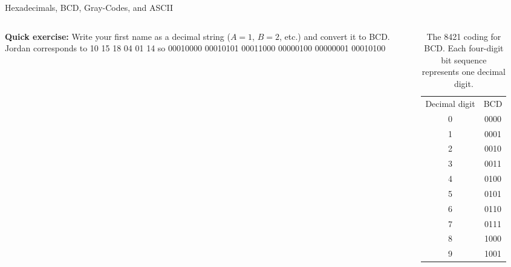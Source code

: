 \documentclass{beamer}
\begin{document}
\begin{frame}{Hexadecimals, BCD, Gray-Codes, and ASCII}
\small
\begin{columns}[T]
\begin{column}{0.5\textwidth}
\textbf{Quick exercise:} Write your first name as a decimal string ($A=1$, $B=2$, etc.) and convert it to BCD. \\ \vspace{0.5cm}
Jordan corresponds to 10 15 18 04 01 14 so 00010000 00010101 00011000 00000100 00000001 00010100
\end{column}
\begin{column}{0.5\textwidth}
\begin{table}
\centering
\begin{tabular}{c c}
Decimal digit & BCD \\
0 & 0000 \\
1 & 0001 \\
2 & 0010 \\
3 & 0011 \\
4 & 0100 \\
5 & 0101 \\
6 & 0110 \\
7 & 0111 \\
8 & 1000 \\
9 & 1001 \\
\end{tabular}
\caption{\label{tab:bcd} \small The 8421 coding for BCD.  Each four-digit bit sequence represents one decimal digit.}
\end{table}
\end{column}
\end{columns}
\end{frame}
\end{document}
